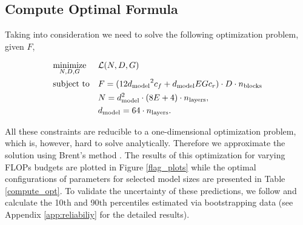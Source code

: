 



\subsection{Compute Optimal Formula} \label{optimi}

Taking into consideration we need to solve the following optimization problem, given $F$,

\begin{equation*}
    \begin{aligned}
        & \underset{N, D, G}{\text{minimize}}
        & & \mathcal{L}(N, D, G) \\
        & \text{subject to}
        & & F = (12{d_\text{model}}^2c_f + d_\text{model} EGc_r) \cdot D \cdot n_\text{blocks}\\
        & & & N = d_{\text{model}}^2 \cdot (8E + 4) \cdot n_{\text{layers}}, \\
        & & & d_{\text{model}} = 64 \cdot n_{\text{layers}}.
    \end{aligned}
\end{equation*}

All these constraints are reducible to a one-dimensional optimization problem, which is, however, hard to solve analytically. Therefore we approximate the solution using Brent's method \citep{Brent1971AnAW}. The results of this optimization for varying FLOPs budgets are plotted in Figure \ref{flag_plots} while the optimal configurations of parameters for selected model sizes are presented in Table \ref{compute_opt}. To validate the uncertainty of these predictions, we follow \cite{hoffmann2022training} and calculate the 10$\text{th}$ and 90$\text{th}$ percentiles estimated via bootstrapping data (see Appendix \ref{app:reliabiliy} for the detailed results).

